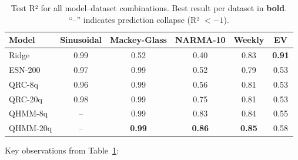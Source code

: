 \begin{table}[htbp]
  \centering
  \caption{Test R² for all model--dataset combinations.
    Best result per dataset in \textbf{bold}.
    ``--'' indicates prediction collapse (R² $< -1$).}
  \label{tab:summary_results}
  \begin{tabular}{@{}lccccc@{}}
    \toprule
    Model & Sinusoidal & Mackey-Glass & NARMA-10 & Weekly & EV \\
    \midrule
    Ridge & 0.99 & 0.52 & 0.40 & 0.83 & \textbf{0.91} \\
    ESN-200 & 0.97 & 0.99 & 0.52 & 0.79 & 0.53 \\
    QRC-8q & 0.96 & 0.99 & 0.56 & 0.81 & 0.53 \\
    QRC-20q & 0.98 & 0.99 & 0.75 & 0.81 & 0.53 \\
    QHMM-8q & -- & 0.99 & 0.83 & 0.84 & 0.55 \\
    QHMM-20q & -- & \textbf{0.99} & \textbf{0.86} & \textbf{0.85} & 0.58 \\
    \bottomrule
  \end{tabular}
\end{table}


Key observations from Table~\ref{tab:summary_results}:


